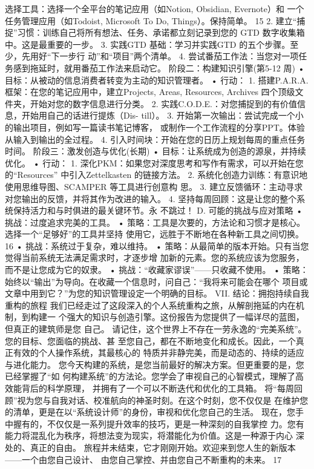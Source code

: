\documentclass[a4paper,12pt]{article}
\begin{document}
\begin{multicols}{2}
    选择工具：选择一个全平台的笔记应用（如Notion, Obsidian, Evernote）和
    一个任务管理应用（如Todoist, Microsoft To Do, Things）。保持简单。
    15 2.
    建立``捕捉''习惯：训练自己将所有想法、任务、承诺都立刻记录到您的 GTD
    数字收集箱中。这是最重要的一步。 3. 实践GTD 基础：学习并实践GTD
    的五个步骤。至少，先用好``下一步行 动''和``项目''两个清单。 4.
    尝试番茄工作法：当您对一项任务感到拖延时，就用番茄工作法来启动它。
    阶段二：构建知识引擎(第5-12 周) •
    目标：从被动的信息消费者转变为主动的知识管理者。 • 行动： 1.
    搭建P.A.R.A. 框架：在您的笔记应用中，建立Projects, Areas, Resources,
    Archives 四个顶级文件夹，开始对您的数字信息进行分类。 2.
    实践C.O.D.E.：对您捕捉到的有价值信息，开始用自己的话进行提炼（Dis-
    till）。 3.
    开始第一次输出：尝试完成一个小的输出项目，例如写一篇读书笔记博客，
    或制作一个工作流程的分享PPT。体验从输入到输出的全过程。 4.
    引入时间块：开始在您的日历上规划每周的重点任务时间。
    阶段三：激发创造与优化(长期) •
    目标：让系统成为创造的源泉，并持续优化。 • 行动： 1.
    深化PKM：如果您对深度思考和写作有需求，可以开始在您的``Resources''
    中引入Zettelkasten 的链接方法。 2.
    系统化创造力训练：有意识地使用思维导图、SCAMPER 等工具进行创意构
    思。 3. 建立反馈循环：主动寻求对您输出的反馈，并将其作为改进的输入。
    4.
    坚持每周回顾：这是让您的整个系统保持活力和与时俱进的最关键环节。永
    不跳过！ D. 可能的挑战与应对策略 • 挑战：过度追求完美的工具。 •
    策略：工具是次要的，方法论和习惯才是核心。选择一个``足够好''的工具并坚持
    使用它，远胜于不断地在各种新工具之间切换。 16 •
    挑战：系统过于复杂，难以维持。 •
    策略：从最简单的版本开始。只有当您觉得当前系统无法满足需求时，才逐步增
    加新的元素。您的系统应该为您服务，而不是让您成为它的奴隶。 •
    挑战：``收藏家谬误''------只收藏不使用。 •
    策略：始终以``输出''为导向。在收藏一个信息时，问自己：``我将来可能会在哪个
    项目或文章中用到它？''为您的知识管理设定一个明确的目标。 VII.
    结论：拥抱持续自我重构的旅程
    我们已经走过了这段深入的个人系统重构之旅，从解剖拖延的内在机制，到构建一
    个强大的知识与创造引擎。这份报告为您提供了一幅详尽的蓝图，但真正的建筑师是您
    自己。
    请记住，这个世界上不存在一劳永逸的``完美系统''。您的目标、您面临的挑战、甚
    至您自己，都在不断地变化和成长。因此，一个真正有效的个人操作系统，其最核心的
    特质并非静  完美，而是动态的、持续的适应与进化能力。
    您今天构建的系统，是您当前最好的解决方案。但更重要的是，您已经掌握了``如
    何构建系统''的方法论。您学会了审视自己的心智模式，理解了高效能背后的科学原理，
    并拥有了一个可以不断迭代和优化的工具箱。
    将``每周回顾''视为您与自我对话、校准航向的神圣时刻。在这个时刻，您不仅仅是
    在维护您的清单，更是在以``系统设计师''的身份，审视和优化您自己的生活。
    现在，您手中握有的，不仅仅是一系列提升效率的技巧，更是一种深刻的自我掌控
    力。您有能力将混乱化为秩序，将想法变为现实，将潜能化为价值。这是一种源于内心
    深处的、真正的自由。
    旅程并未结束，它才刚刚开始。欢迎来到您人生的新版本------一个由您自己设计、
    由您自己掌控、并由您自己不断重构的未来。 17

\end{multicols}
\end{document}
